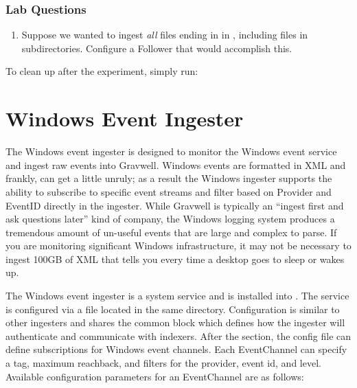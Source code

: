 \subsubsection{Lab Questions}

\begin{enumerate}
\item
  Suppose we wanted to ingest \emph{all} files ending in  in
  , including files in subdirectories. Configure a Follower that
  would accomplish this.
\end{enumerate}

To clean up after the experiment, simply run:


\clearpage

\section{Windows Event Ingester}
The Windows event ingester is designed to monitor the Windows event
service and ingest raw events into Gravwell. Windows events are
formatted in XML and frankly, can get a little unruly; as a result the
Windows ingester supports the ability to subscribe to specific event
streams and filter based on Provider and EventID directly in the
ingester. While Gravwell is typically an ``ingest first and ask
questions later'' kind of company, the Windows logging system produces a
tremendous amount of un-useful events that are large and complex to
parse. If you are monitoring significant Windows infrastructure, it may
not be necessary to ingest 100GB of XML that tells you every time a
desktop goes to sleep or wakes up.

The Windows event ingester is a system service and is installed into
. The service is configured
via a  file located in the same directory. Configuration
is similar to other ingesters and shares the common
\code{[Global]} block which defines how the ingester will authenticate
and communicate with indexers. After the \code{[Global]} section, the config
file can define subscriptions for Windows event channels. Each EventChannel can
specify a tag, maximum reachback, and filters for the provider, event
id, and level. Available configuration parameters for an EventChannel
are as follows:

